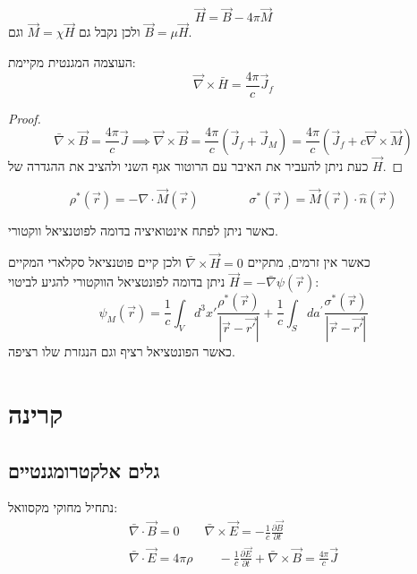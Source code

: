 \documentclass{tstextbook}
\begin{document}
\begin{definition}
$$\vec{H}=\vec{B}-4\pi\vec{M}$$
ולכן נקבל גם \(\vec{M}=\chi \vec{H}\) וגם \(\vec{B}=\mu \vec{H}\).

\end{definition}
\begin{proposition}
העוצמה המגנטית מקיימת:
$$\vec{\nabla}\times \bar{H}=\frac{4\pi}{c}\vec{J}_{f}$$

\end{proposition}
\begin{proof}
$$\bar{\nabla} \times \vec{B} =\frac{4\pi}{c}\vec{J}\implies\vec{\nabla}\times\vec{B}={\frac{4\pi}{c}}\left(\vec{J}_{f}+\vec{J}_{M}\right)={\frac{4\pi}{c}}\left(\vec{J}_{f}+c\vec{\nabla}\times\vec{M}\right)$$
כעת ניתן להעביר את האיבר עם הרוטור אגף השני ולהציב את ההגדרה של \(\vec{H}\).

\end{proof}
\begin{definition}
$$\rho^{*}(\vec{r})=-\nabla\cdot\vec{M}(\vec{r})\qquad\qquad\sigma^{*}(\vec{r})=\vec{M}(\vec{r})\cdot\hat{n}(\vec{r})$$

\end{definition}
כאשר ניתן לפתח אינטואיציה בדומה לפוטנציאל ווקטורי.

\begin{proposition}
כאשר אין זרמים, מתקיים \(\bar{\nabla} \times \vec{H}=0\) ולכן קיים פוטנציאל סקלארי המקיים \(\vec{H}=-\bar{\nabla}\psi\left( \vec{r} \right)\) ניתן בדומה לפונטציאל הווקטורי להגיע לביטוי:
$$\psi_{M}(\vec{r})=\frac{1}{c}\int_{V}d^{3}x'\frac{\rho^{*}(\vec{r})}{|\vec{r}-\vec{r'}|}+\frac{1}{c}\int_{S}d a^{\prime}\frac{\sigma^{*}(\vec{r})}{|\vec{r}-\vec{r'}|}$$
כאשר הפונטציאל רציף וגם הנגזרת שלו רציפה.

\end{proposition}
\section{קרינה}

\subsection{גלים אלקטרומגנטיים}

נתחיל מחוקי מקסוואל:
$$\begin{gather} \bar{\nabla} \cdot \vec{B} = 0 \qquad \bar{\nabla} \times \vec{E} = -\frac{1}{c} \frac{\partial \vec{B}}{\partial t} \\\bar{\nabla} \cdot \vec{E}=4\pi \rho \qquad -\frac{1}{c}\frac{\partial \vec{E}}{\partial t} + \bar{\nabla} \times \vec{B} = \frac{4\pi}{c}\vec{J} 
\end{gather}$$
\end{document}
